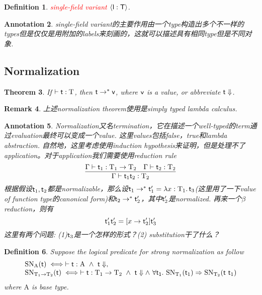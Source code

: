 \documentclass{article}
\theoremstyle{plain}
\newtheorem{theorem}{Theorem}
\newtheorem{definition}[theorem]{Definition}
\newtheorem{remark}[theorem]{Remark}
\newtheorem{annotation}[theorem]{Annotation}
\theoremstyle{nonumberplain}
\newcommand{\lam}[2]{\ensuremath{\lambda #1\ldotp #2}} %
\newcommand{\singletype}[1]{\text{#1}}
\newcommand{\termtype}[2]{\ensuremath{#1:#2}}
\newcommand{\term}[1]{\ensuremath\mathsf{#1}}
\newcommand{\redt}[1]{\textcolor{red}{#1}}
\begin{document}
\begin{definition}
\rm \redt{single-field variant} $\left<\term{l}:\term{T} \right>$.
\end{definition}

\begin{annotation}
\rm single-field variant的主要作用由一个type构造出多个不一样的types但是仅仅是用附加的labels来刻画的，这就可以描述具有相同type但是不同对象.
\end{annotation}

\newpage
\subsection{Normalization}

\begin{theorem}
\rm If $\vdash \term{t}:\singletype{T}$, then $\term{t} \to^* \term{v}$, where $\term{v}$ is a value, or abbreviate $\term{t}\Downarrow$. 
\end{theorem}

\begin{remark}
\rm 上述normalization theorem使用是simply typed lambda calculus. 
\end{remark}

\begin{annotation}
\rm Normalization又名termination，它在描述一个well-typed的term通过evaluation最终可以变成一个value. 这里values包括false，true和lambda abstraction. 自然地，这里考虑使用induction hypothesis来证明，但是处理不了application。对于application我们需要使用reduction rule
$$
\infer{\Gamma \vdash \termtype{\term{t}_1 \term{t}_2}{\singletype{T}_2}}{\Gamma	\vdash \termtype{\term{t}_1}{\singletype{T}_1 \to \singletype{T}_2 } & \Gamma \vdash \termtype{\term{t}_2}{\singletype{T}_2} }
$$
根据假设$\term{t}_1, \term{t}_2$都是normalizable，那么设$\term{t}_1 \to^* \term{t}_1' = \lam{\termtype{x}{\singletype{T}_1}}{\term{t}_3}$(这里用了一下value of function type的canonical form)和$\term{t}_2 \to^* \term{t}_2'$，其中$\term{t}_2'$是normalized. 再来一个$\beta$ reduction，则有
$$
\term{t}_1' \term{t}_2' = [x \to \term{t}_2']\term{t}_3'
$$
这里有两个问题: (1)$\term{t}_3$是一个怎样的形式？(2) substitution干了什么？  
\end{annotation}


\begin{definition}\label{logical predicate of SN}
\rm Suppose the logical predicate for strong normalization as follow
$$
\begin{array}{ll}
\text{SN}_{\singletype{A}}(\term{t}) \iff \vdash \termtype{\term{t}}{\singletype{A}} ~\wedge~ \term{t}\Downarrow,\\
\text{SN}_{\singletype{T}_1 \to \singletype{T}_2}(\term{t}) \iff \vdash \termtype{\term{t}}{\singletype{T}_1 \to \singletype{T}_2} ~\wedge~ \term{t}\Downarrow \wedge ~\forall \term{t_1}.~\text{SN}_{\singletype{T}_1}(\term{t}_1) \Rightarrow \text{SN}_{\singletype{T}_2}(\term{t}~\term{t}_1)
\end{array} 
$$
where $\singletype{A}$ is base type. 
\end{definition}
\end{document}
